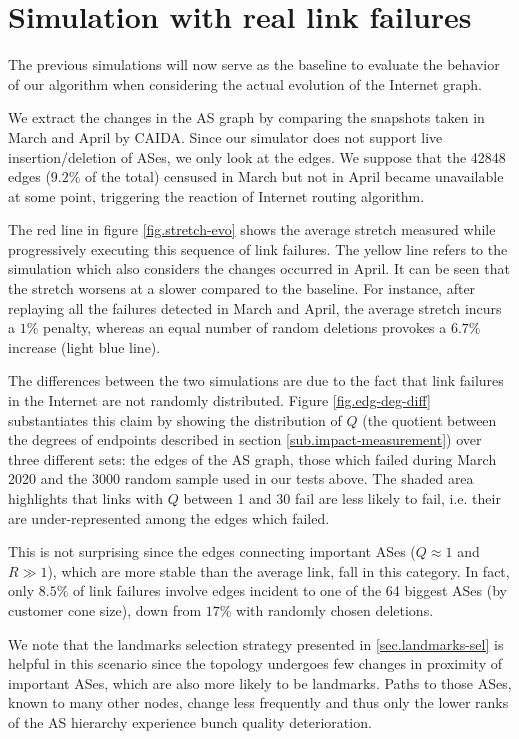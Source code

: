 \documentclass[a4paper,11pt,oneside]{report}
\begin{document}
\section{Simulation with real link failures}
The previous simulations will now serve as the baseline to evaluate the behavior of our algorithm when considering the actual evolution of the Internet graph.

We extract the changes in the AS graph by comparing the snapshots taken in March and April by CAIDA. Since our simulator does not support live insertion/deletion of ASes, we only look at the edges. We suppose that the 42848 edges ($9.2\%$ of the total) censused in March but not in April became unavailable at some point, triggering the reaction of Internet routing algorithm.

The red line in figure \ref{fig.stretch-evo} shows the average stretch measured while progressively executing this sequence of link failures. The yellow line refers to the simulation which also considers the changes occurred in April.
It can be seen that the stretch worsens at a slower compared to the baseline. For instance, after replaying all the failures detected in March and April, the average stretch incurs a $1\%$ penalty, whereas an equal number of random deletions provokes a $6.7\%$ increase (light blue line).

\bigskip
The differences between the two simulations are due to the fact that link failures in the Internet are not randomly distributed.
Figure \ref{fig.edg-deg-diff} substantiates this claim by showing the distribution of $Q$ (the quotient between the degrees of endpoints described in section \ref{sub.impact-measurement}) over three different sets: the edges of the AS graph, those which failed during March 2020 and the 3000 random sample used in our tests above.
The shaded area highlights that links with $Q$ between 1 and 30 fail are less likely to fail, i.e. their are under-represented among the edges which failed.

This is not surprising since the edges connecting important ASes ($Q \approx 1$ and $R \gg 1$), which are more stable than the average link, fall in this category.
In fact, only $8.5\%$ of link failures involve edges incident to one of the 64 biggest ASes (by customer cone size), down from $17\%$ with randomly chosen deletions. 

\bigskip
We note that the landmarks selection strategy presented in \ref{sec.landmarks-sel} is helpful in this scenario since the topology undergoes few changes in proximity of important ASes, which are also more likely to be landmarks. Paths to those ASes, known to many other nodes, change less frequently and thus only the lower ranks of the AS hierarchy experience bunch quality deterioration. 
\end{document}
